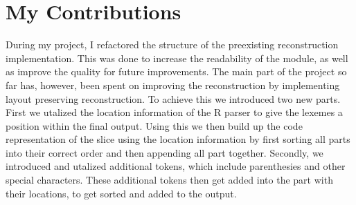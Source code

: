 \documentclass[a3paper, portrait, english, default]{uulm-cs-poster}
\begin{document}
\section*{My Contributions}
\begin{multicols}{4}
	During my project, I refactored the structure of the preexisting reconstruction implementation. This was done to increase the readability of the module, as well as improve the quality for future improvements. The main part of the project so far has, however, been spent on improving the reconstruction by implementing layout preserving reconstruction.
	To achieve this we introduced two new parts. First we utalized the location information of the R parser to give the lexemes a position within the final output. Using this we then build up the code representation of the slice using the location information by first sorting all parts into their correct order and then appending all part together.
	Secondly, we introduced and utalized additional tokens, which include parenthesies and other special characters. These additional tokens then get added into the part with their locations, to get sorted and added to the output.
\end{multicols}
\end{document}
